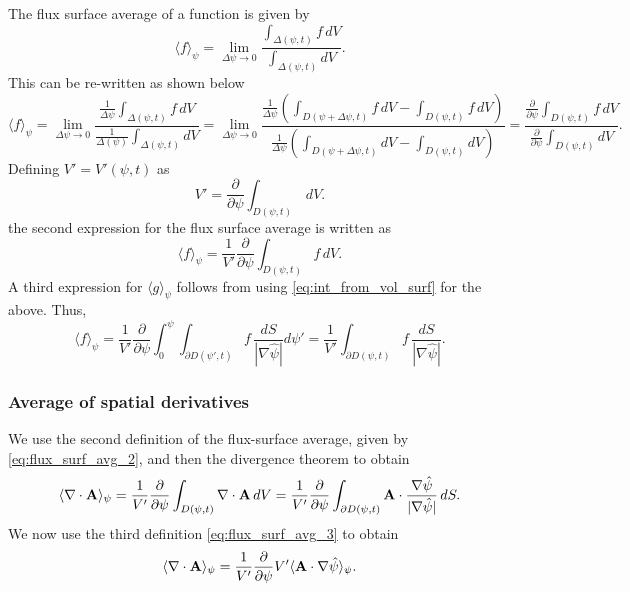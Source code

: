 \documentclass[11pt]{article}
\begin{document}
The flux surface average of a function is given by
\begin{equation}
\label{eq:flux_surf_avg_1}
    \langle f \rangle_\psi = \lim_{\Delta \psi \to 0} \frac{ \int_{\Delta(\psi,t)} f \, d V}{\int_{\Delta(\psi,t)} d V}.
\end{equation}
This can be re-written as shown below
\begin{equation}
    \langle f \rangle_\psi = \lim_{\Delta \psi \to 0} \frac{ \frac{1}{\Delta \psi} \int_{\Delta(\psi,t)} f \, d V}{ \frac{1}{\Delta(\psi)} \int_{\Delta(\psi,t)} d V} = \lim_{\Delta \psi \to 0} \frac{ \frac{1}{\Delta \psi} \left ( \int_{D(\psi + \Delta \psi,t)} f\, d V - \int_{D(\psi,t)} f\, d V \right)}{ \frac{1}{\Delta \psi} \left (\int_{D(\psi + \Delta \psi,t)} d V - \int_{D(\psi,t)} d V \right )} = \frac{ \frac{\partial}{\partial \psi} \int_{D(\psi,t)} f \, d V}{ \frac{\partial}{\partial \psi} \int_{D(\psi,t)} d V} .
\end{equation}
Defining $V' = V'(\psi,t)$ as 
\begin{equation}
    V' = \frac{\partial}{\partial \psi} \int_{D(\psi,t)} \, dV.
\end{equation}
the second expression for the flux surface average is written as
\begin{equation}
\label{eq:flux_surf_avg_2}
    \langle f \rangle_\psi = \frac{1}{V'} \frac{\partial}{\partial \psi} \int_{D(\psi,t)} f \, d V .
\end{equation}
A third expression for $\langle g \rangle_\psi$ follows from using \cref{eq:int_from_vol_surf} for the above. Thus,
\begin{equation}
\label{eq:flux_surf_avg_3}
    \langle f \rangle_\psi = \frac{1}{V'} \frac{\partial}{\partial \psi} \int_0^\psi \int_{\partial D(\psi',t)} f \, \frac{d S}{| \nabla \hat{\psi} |} d\psi' = \frac{1}{V'}  \int_{\partial D(\psi,t)} f \, \frac{d S}{| \nabla \hat{\psi} |} .
\end{equation}

\subsubsection{Average of spatial derivatives}
We use the second definition of the flux-surface average, given by \cref{eq:flux_surf_avg_2}, and then the divergence theorem to obtain
\begin{equation}
    \langle \nabla \cdot \mathbf{A} \rangle_\psi = \frac{1}{V'} \frac{\partial}{\partial \psi} \int_{D(\psi,t)} \nabla \cdot \mathbf{A} \,dV = \frac{1}{V'} \frac{\partial}{\partial \psi} \int_{\partial D(\psi,t)} \mathbf{A} \cdot  \frac{\nabla \hat{\psi}}{|\nabla \hat{\psi}|} \, dS.
\end{equation}
We now use the third definition \cref{eq:flux_surf_avg_3} to obtain
\begin{equation}
    \langle \nabla \cdot \mathbf{A} \rangle_\psi = \frac{1}{V'} \frac{\partial}{\partial \psi} V' \langle \mathbf{A} \cdot \nabla \hat{\psi} \rangle_\psi.
\end{equation}
\end{document}
